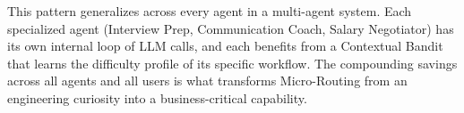 \documentclass[12pt,a4paper]{article}
\begin{document}
This pattern generalizes across every agent in a multi-agent system. Each specialized agent (Interview Prep, Communication Coach, Salary Negotiator) has its own internal loop of LLM calls, and each benefits from a Contextual Bandit that learns the difficulty profile of its specific workflow. The compounding savings across all agents and all users is what transforms Micro-Routing from an engineering curiosity into a business-critical capability.
\end{document}
